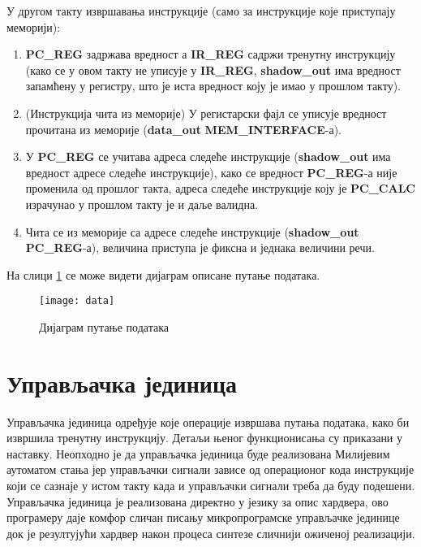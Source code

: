 У другом такту извршавања инструкције (само за инструкције које приступају меморији):

\begin{enumerate}
	\item \textbf{PC\_REG} задржава вредност а \textbf{IR\_REG} садржи тренутну инструкцију (како се у овом такту не уписује у \textbf{IR\_REG}, \textbf{shadow\_out} има вредност запамћену у регистру, што је иста вредност коју је имао у прошлом такту).
	\item (Инструкција чита из меморије) У регистарски фајл се уписује вредност прочитана из меморије (\textbf{data\_out} \textbf{MEM\_INTERFACE}-а).
	\item У \textbf{PC\_REG} се учитава адреса следеће инструкције (\textbf{shadow\_out} има вредност адресе следеће инструкције), како се вредност \textbf{PC\_REG}-а није променила од прошлог такта, адреса следеће инструкције коју је \textbf{PC\_CALC} израчунао у прошлом такту је и даље валидна.
	\item Чита се из меморије са адресе следеће инструкције (\textbf{shadow\_out} \textbf{PC\_REG}-а), величина приступа је фиксна и једнака величини речи.
	
\end{enumerate}

На слици \ref{fig:data} се може видети дијаграм описане путање података. \newpage

\begin{figure}[h!]
	\centering
	\texttt{[image: data]}
	\caption{Дијаграм путање података}
	\label{fig:data}
\end{figure}

\section{Управљачка јединица}

Управљачка јединица одређује које операције извршава путања података, како би извршила тренутну инструкцију. Детаљи њеног функционисања су приказани у наставку.
Неопходно је да управљачка јединица буде реализована Милијевим аутоматом стања јер управљачки сигнали зависе од операционог кода инструкције који се сазнаје у истом такту када и управљачки сигнали треба да буду подешени. Управљачка јединица је реализована директно у језику за опис хардвера, ово програмеру даје комфор сличан писању микропрограмске управљачке јединице док је резултујући хардвер након процеса синтезе сличнији ожиченој реализацији.

